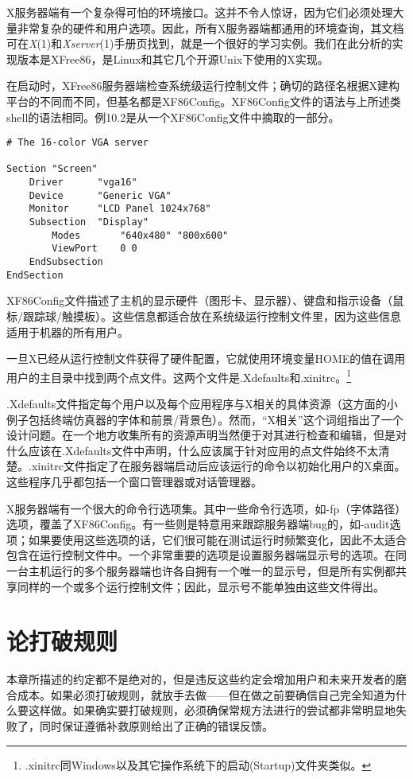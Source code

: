 \documentclass[12pt,oneside]{book}
\begin{document}
\begin{common-format}
X服务器端有一个复杂得可怕的环境接口。这并不令人惊讶，因为它们必须处理大量非常复杂的硬件和用户选项。因此，所有X服务器端都通用的环境查询，其文档可在\textit{X}(1)和\textit{Xserver}(1)手册页找到，就是一个很好的学习实例。我们在此分析的实现版本是XFree86，是Linux和其它几个开源Unix下使用的X实现。

在启动时，XFree86服务器端检查系统级运行控制文件；确切的路径名根据X建构平台的不同而不同，但基名都是XF86Config。XF86Config文件的语法与上所述类shell的语法相同。例10.2是从一个XF86Config文件中摘取的一部分。

\begin{Verbatim}[label=例10.2  X配置示例]
# The 16-color VGA server

Section "Screen"
    Driver      "vga16"
    Device      "Generic VGA"
    Monitor     "LCD Panel 1024x768"
    Subsection  "Display"
        Modes       "640x480" "800x600"
        ViewPort    0 0
    EndSubsection
EndSection
\end{Verbatim}


XF86Config文件描述了主机的显示硬件（图形卡、显示器）、键盘和指示设备（鼠标/跟踪球/触摸板）。这些信息都适合放在系统级运行控制文件里，因为这些信息适用于机器的所有用户。

一旦X已经从运行控制文件获得了硬件配置，它就使用环境变量HOME的值在调用用户的主目录中找到两个点文件。这两个文件是.Xdefaults和.xinitrc。\footnote{.xinitrc同Windows以及其它操作系统下的启动(Startup)文件夹类似。}

.Xdefaults文件指定每个用户以及每个应用程序与X相关的具体资源（这方面的小例子包括终端仿真器的字体和前景/背景色）。然而，“X相关”这个词组指出了一个设计问题。在一个地方收集所有的资源声明当然便于对其进行检查和编辑，但是对什么应该在.Xdefaults文件中声明，什么应该属于针对应用的点文件始终不太清楚。.xinitrc文件指定了在服务器端启动后应该运行的命令以初始化用户的X桌面。这些程序几乎都包括一个窗口管理器或对话管理器。

X服务器端有一个很大的命令行选项集。其中一些命令行选项，如-fp（字体路径）选项，覆盖了XF86Config。有一些则是特意用来跟踪服务器端bug的，如-audit选项；如果要使用这些选项的话，它们很可能在测试运行时频繁变化，因此不太适合包含在运行控制文件中。一个非常重要的选项是设置服务器端显示号的选项。在同一台主机运行的多个服务器端也许各自拥有一个唯一的显示号，但是所有实例都共享同样的一个或多个运行控制文件；因此，显示号不能单独由这些文件得出。

\section{论打破规则}
本章所描述的约定都不是绝对的，但是违反这些约定会增加用户和未来开发者的磨合成本。如果必须打破规则，就放手去做——但在做之前要确信自己完全知道为什么要这样做。如果确实要打破规则，必须确保常规方法进行的尝试都非常明显地失败了，同时保证遵循补救原则给出了正确的错误反馈。





\end{common-format}
\end{document}
